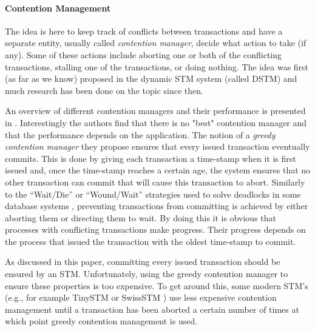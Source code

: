 \paragraph{Contention Management} The idea is here to keep
track of conflicts between transactions and have a separate entity, usually
called {\it contention manager}, decide what action to take (if any). 
Some  of these  actions include  aborting one  or both  of  the conflicting
transactions, stalling one of the transactions, or doing nothing. 
The idea  was  first (as far as we know) proposed  in  the dynamic 
STM system (called DSTM) \cite{HLMS03} and much research has been done on the
topic since then. 

An overview  of different contention managers and their performance is
presented  in \cite{GHP05}. Interestingly the authors find that there is no 
"best" contention manager and that the performance depends on the application. 
The notion of a {\it greedy contention manager} they propose
ensures that every issued transaction  eventually commits. 
This  is done  by giving  each transaction  a time-stamp  when it  is first
issued and,  once the  time-stamp reaches a  certain age, the  system ensures
that no  other transaction can commit  that will cause  this transaction to
abort.  Similarly to  the ``Wait/Die''  or ``Wound/Wait''
strategies used to solve deadlocks in some database systems  \cite{RSL78}, 
preventing  transactions from committing is  achieved by either
aborting them or directing them to wait. 
By  doing  this   it  is  obvious  that  processes  with  conflicting
transactions  make progress. Their progress  depends on the  process that
issued the transaction  with the oldest time-stamp to commit. 

As discussed  in this paper,  committing every issued transaction  should be
ensured by an STM. 
Unfortunately,  using the  greedy contention  manager 
to  ensure these  properties  is too expensive.  
%
To  get around  this,  some modern  STM's (e.g., for example  
TinySTM  \cite{FFR08}   or  SwissSTM   \cite{DGK09})  use   less  expensive
contention  management  until  a transaction  has been   aborted a  certain
number  of times  at  which point greedy contention management is used. 

